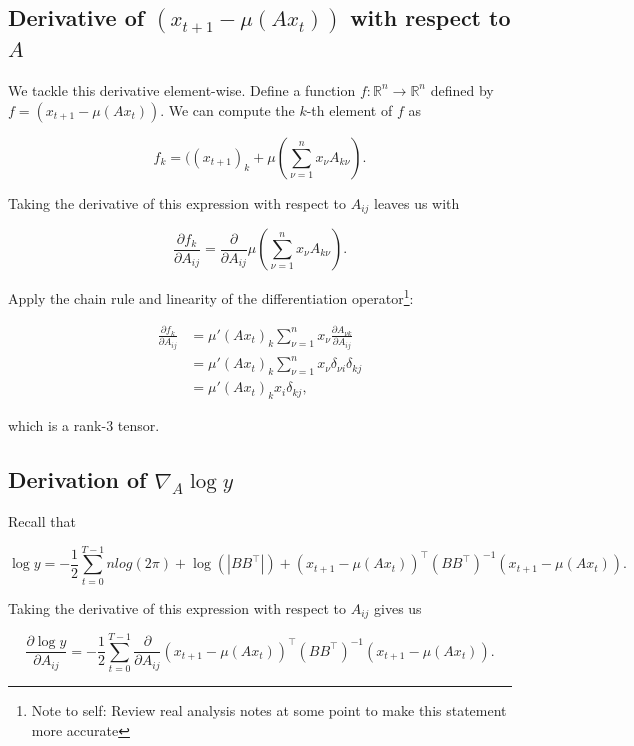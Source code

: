 \documentclass{article}
\theoremstyle{definition}
\begin{document}
\subsection{Derivative of $(x_{t+1} - \mu(Ax_t))$ with respect to $A$}
\label{subsec:yTermDerivative}

We tackle this derivative element-wise. Define a function $f: \mathbb{R}^{n} \rightarrow \mathbb{R}^n$ defined by $f = (x_{t+1} - \mu(Ax_t))$. We can compute the $k$-th element of $f$ as 

\[
f_k = ((x_{t+1})_k + \mu(\sum_{\nu = 1}^{n} x_\nu A_{k\nu}).
\]

Taking the derivative of this expression with respect to $A_{ij}$ leaves us with

\[
\frac{\partial f_k}{\partial A_{ij}} = \frac{\partial}{\partial A_{ij}} \mu(\sum_{\nu = 1}^{n} x_\nu A_{k\nu}).
\]

Apply the chain rule and linearity of the differentiation operator\footnote{Note to self: Review real analysis notes at some point to make this statement more accurate}:

\[
\begin{split}
    \frac{\partial f_k}{\partial A_{ij}} &= \mu'(Ax_t)_k \sum_{\nu = 1}^{n}x_\nu \frac{\partial A_{\nu k}}{\partial A_{ij}} \\ 
    & = \mu'(Ax_t)_k \sum_{\nu = 1}^{n}x_\nu \delta_{\nu i} \delta_{kj} \\ 
    & = \mu'(Ax_t)_k x_i \delta_{kj},
\end{split}
\]

which is a rank-$3$ tensor. 

\subsection{Derivation of $\nabla_A \log y$}
\label{subsec:gradADerivation}

Recall that 

\[
\log y =  - \frac{1}{2} \sum_{t=0}^{T - 1} n log(2\pi) + \log(|BB^\top|) + (x_{t+1} - \mu(Ax_t))^\top (BB^\top)^{-1} (x_{t+1} - \mu(Ax_t)).
\] 

Taking the derivative of this expression with respect to $A_{ij}$ gives us

\begin{equation}
    \label{eqn:likelihoodDerivativeA}
    \frac{\partial \log y}{\partial A_{ij}} = - \frac{1}{2} \sum_{t=0}^{T - 1} \frac{\partial}{\partial A_{ij}} (x_{t+1} - \mu(Ax_t))^\top (BB^\top)^{-1} (x_{t+1} - \mu(Ax_t)).
\end{equation}
\end{document}
